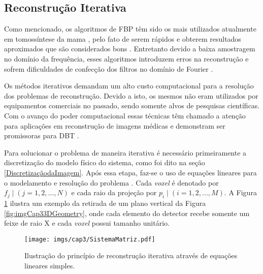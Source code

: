 
\subsection{Reconstrução Iterativa}

Como mencionado, os algoritmos de \acs{FBP} têm sido os mais utilizados atualmente em tomossíntese da mama \cite{michell2018role}, pelo fato de serem rápidos e obterem resultados aproximados que são considerados bons \cite{das2011penalized}. Entretanto devido a baixa amostragem no domínio da frequência, esses algoritmos introduzem erros na reconstrução e sofrem dificuldades de confecção dos filtros no domínio de Fourier \cite{xu2015statistical}.

Os métodos iterativos demandam um alto custo computacional para a resolução dos problemas de reconstrução. Devido a isto, os mesmos não eram utilizados por equipamentos comerciais no passado, sendo somente alvos de pesquisas científicas. Com o avanço do poder computacional essas técnicas têm chamado a atenção para aplicações em reconstrução de imagens médicas e demonstram ser promissoras para \acs{DBT} \cite{zeng2010medical,zheng2018detector}.

Para solucionar o problema de maneira iterativa é necessário primeiramente a discretização do modelo físico do sistema, como foi dito na seção \ref{DiscretizaçãodaImagem}. Após essa etapa, faz-se o uso de equações lineares para o modelamento e resolução do problema \cite[p. 125]{zeng2010medical}. Cada \textit{voxel} é denotado por $f_{j} \mid (j=1,2,...,N)$ e cada raio da projeção por $p_{i} \mid (i=1,2,...,M)$. A Figura \ref{fig:imgCap3SistemaMatriz} ilustra um exemplo da retirada de um plano vertical da Figura \ref{fig:imgCap33DGeometry}, onde cada elemento do detector recebe somente um feixe de raio X  e cada \textit{voxel} possui tamanho unitário.  

\begin{figure}[H]
	\caption{Ilustração do princípio de reconstrução iterativa através de equações lineares simples.}
	\begin{center}
		\texttt{[image: imgs/cap3/SistemaMatriz.pdf]}
	\end{center}
	\label{fig:imgCap3SistemaMatriz}
\end{figure} 

